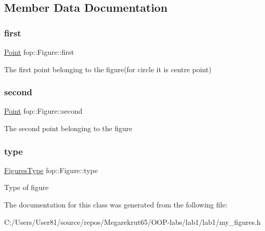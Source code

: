 \subsection{Member Data Documentation}
\mbox{\label{classfop_1_1_figure_afac8422d33b66489e3a7ddda4751d219}} 
\subsubsection{\texorpdfstring{first}{first}}
{\footnotesize\ttfamily \mbox{\hyperlink{structtdp_1_1_point}{Point}} fop\+::\+Figure\+::first}

The first point belonging to the figure(for circle it is centre point) \mbox{\label{classfop_1_1_figure_a10aa53d6dcfa427b06ebcf93ae6075b9}} 
\subsubsection{\texorpdfstring{second}{second}}
{\footnotesize\ttfamily \mbox{\hyperlink{structtdp_1_1_point}{Point}} fop\+::\+Figure\+::second}

The second point belonging to the figure \mbox{\label{classfop_1_1_figure_ab3800215a1229d637bae3c24cfc59e08}} 
\subsubsection{\texorpdfstring{type}{type}}
{\footnotesize\ttfamily \mbox{\hyperlink{namespacefop_a60dafe2e1ac5bb402dad57ecacde23d5}{Figures\+Type}} fop\+::\+Figure\+::type}

Type of figure 

The documentation for this class was generated from the following file\+:\begin{DoxyCompactItemize}
\item 
C\+:/\+Users/\+User81/source/repos/\+Megarekrut65/\+O\+O\+P-\/labs/lab1/lab1/my\+\_\+figures.\+h\end{DoxyCompactItemize}
